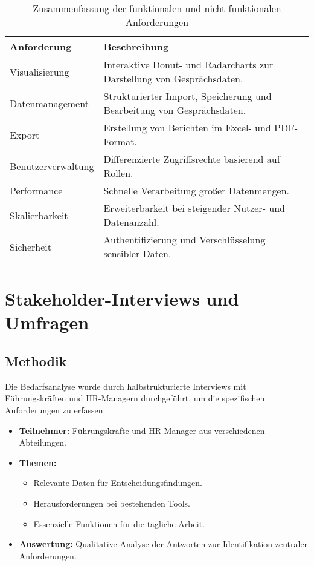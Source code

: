 \begin{table}[h!]
\centering
\caption{Zusammenfassung der funktionalen und nicht-funktionalen Anforderungen}
\label{tab:anforderungen_uebersicht}
\begin{tabularx}{\textwidth}{|X|X|}
\hline
\textbf{Anforderung}              & \textbf{Beschreibung}                                                                                                   \\\hline
Visualisierung                   & Interaktive Donut- und Radarcharts zur Darstellung von Gesprächsdaten. \\\hline
Datenmanagement                  & Strukturierter Import, Speicherung und Bearbeitung von Gesprächsdaten. \\\hline
Export                           & Erstellung von Berichten im Excel- und PDF-Format. \\\hline
Benutzerverwaltung               & Differenzierte Zugriffsrechte basierend auf Rollen. \\\hline
Performance                      & Schnelle Verarbeitung großer Datenmengen. \\\hline
Skalierbarkeit                   & Erweiterbarkeit bei steigender Nutzer- und Datenanzahl. \\\hline
Sicherheit                       & Authentifizierung und Verschlüsselung sensibler Daten. \\\hline
\end{tabularx}
\end{table}

\section{Stakeholder-Interviews und Umfragen}
\subsection{Methodik}
Die Bedarfsanalyse wurde durch halbstrukturierte Interviews mit Führungskräften und HR-Managern durchgeführt, um die spezifischen Anforderungen zu erfassen:
\begin{itemize}
    \item \textbf{Teilnehmer:} Führungskräfte und HR-Manager aus verschiedenen Abteilungen.
    \item \textbf{Themen:}
    \begin{itemize}
        \item Relevante Daten für Entscheidungsfindungen.
        \item Herausforderungen bei bestehenden Tools.
        \item Essenzielle Funktionen für die tägliche Arbeit.
    \end{itemize}
    \item \textbf{Auswertung:} Qualitative Analyse der Antworten zur Identifikation zentraler Anforderungen.
\end{itemize}

